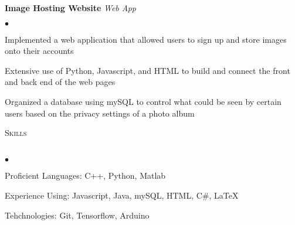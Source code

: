 \documentclass[letterpaper, 11pt]{article}
\newcommand{\lineunder}{\vspace*{-8pt} \\ \hspace*{-18pt} \hrulefill \\}
\newcommand{\header}[1]{{\hspace*{-15pt}\vspace*{6pt} \textsc{#1}}\vspace*{-6pt} \lineunder}
\newenvironment{achievements}{\begin{list}{$\bullet$}{\topsep 0pt \itemsep -2pt}}{\vspace*{4pt}\end{list}}
\begin{document}
\textbf{Image Hosting Website} \textit{Web App}
\begin{achievements}
	\item Implemented a web application that allowed users to sign up and store images onto their accounts
	\item Extensive use of Python, Javascript, and HTML to build and connect the front and back end of the web pages
	\item Organized a database using mySQL to control what could be seen by certain users based on the privacy settings of a photo album
\end{achievements}


\header{Skills}
	\begin{achievements}
		\item Proficient Languages: C++, Python,  Matlab
		\item Experience Using: Javascript, Java, mySQL, HTML, C\#, \LaTeX
		\item Tehchnologies: Git, Tensorflow, Arduino
	\end{achievements}
\end{document}
